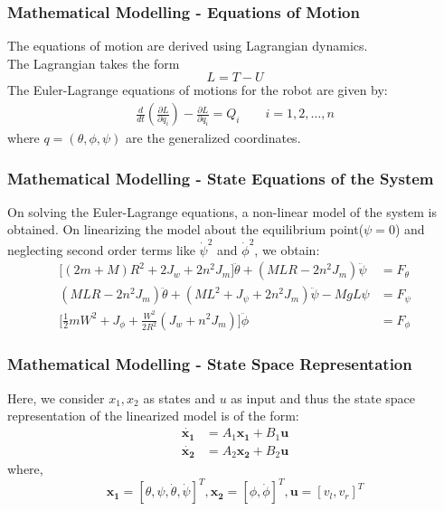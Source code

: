 \documentclass[aspectratio=169]{beamer}
\begin{document}

\begin{frame}
\frametitle{Mathematical Modelling - Equations of Motion}
The equations of motion are derived using Lagrangian dynamics. \\
The Lagrangian takes the form
\begin{displaymath}
L = T - U
\end{displaymath}
The Euler-Lagrange equations of motions for the robot are given by:
\begin{align*}
\frac{d}{dt} \left(\frac{\partial L}{\partial \dot{q_{i}}}\right) - \frac{\partial L}{\partial q_{i}} = Q_{i}\qquad	i = 1,2,\ldots ,n
\end{align*}
where $q = (\theta,\phi,\psi)$ are the generalized coordinates.
\end{frame}


\begin{frame}
\frametitle{Mathematical Modelling - State Equations of the System}
On solving the Euler-Lagrange equations, a non-linear model of the system is obtained. On linearizing the model about the equilibrium point($\psi=0$) and neglecting second order terms like $\dot{\psi}^2$ and $\dot{\phi}^2$, we obtain:
\begin{align*}
\biggl[(2m+M)R^2+2J_w+2n^2J_m\biggr]\ddot{\theta}
+\left(MLR-2n^2J_m\right)\ddot{\psi} &= F_{\theta} \\
\left(MLR-2n^2J_m\right)\ddot{\theta}+\left(ML^2+J_{\psi}+2n^2J_m\right)\ddot{\psi}-MgL\psi &= F_{\psi} \\
\biggl[\frac{1}{2}mW^2+J_{\phi}+\frac{W^2}{2R^2}\left(J_w+n^2J_m\right)\biggr]\ddot{\phi} &= F_{\phi}
\end{align*}
\end{frame}


\begin{frame}
\frametitle{Mathematical Modelling - State Space Representation}
Here, we consider $x_1,x_2$ as states and $u$ as input and thus the state space representation of the linearized model is of the form:
\begin{align*}
\mathbf{\dot{x_1}} &= A_1\mathbf{x_1}+B_1\mathbf{u} \\
\mathbf{\dot{x_2}} &= A_2\mathbf{x_2}+B_2\mathbf{u}
\end{align*}
where,
\begin{displaymath}
\mathbf{x_1}=[\theta,\psi,\dot{\theta},\dot{\psi}]^T, \mathbf{x_2} = [\phi,\dot{\phi}]^T, \mathbf{u} = [v_l,v_r]^T
\end{displaymath}
\end{frame}
\end{document}
